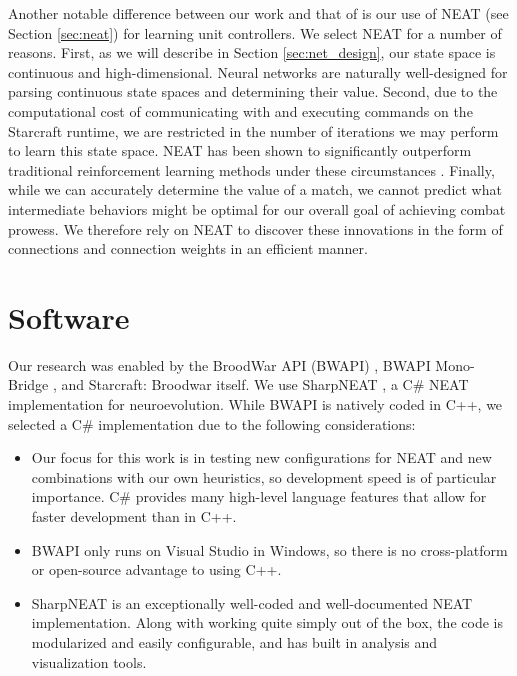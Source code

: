 \documentclass[10pt,a4paper,twocolumn]{article}
\begin{document}
Another notable difference between our work and that of \cite{rl_small_scale_combat} is our use of NEAT (see Section \ref{sec:neat}) for learning unit controllers. We select NEAT for a number of reasons. First, as we will describe in Section \ref{sec:net_design}, our state space is continuous and high-dimensional. Neural networks are naturally well-designed for parsing continuous state spaces and determining their value. Second, due to the computational cost of communicating with and executing commands on the Starcraft runtime, we are restricted in the number of iterations we may perform to learn this state space. NEAT has been shown to significantly outperform traditional reinforcement learning methods under these circumstances \cite{Stanley:2004:EEN:1048234}. Finally, while we can accurately determine the value of a match, we cannot predict what intermediate behaviors might be optimal for our overall goal of achieving combat prowess. We therefore rely on NEAT to discover these innovations in the form of connections and connection weights in an efficient manner.

\section{Software}
\label{sec:soft}

Our research was enabled by the BroodWar API (BWAPI) \cite{bwapi}, BWAPI Mono-Bridge \cite{monobridge}, and Starcraft: Broodwar itself. We use SharpNEAT \cite{sharpneat}, a C\# NEAT implementation for neuroevolution. While BWAPI is natively coded in C++, we selected a C\# implementation due to the following considerations:

\begin{itemize}
	\item Our focus for this work is in testing new configurations for NEAT and new combinations with our own heuristics, so development speed is of particular importance. C\# provides many high-level language features that allow for faster development than in C++.
	\item BWAPI only runs on Visual Studio in Windows, so there is no cross-platform or open-source advantage to using C++.
	\item SharpNEAT is an exceptionally well-coded and well-documented NEAT implementation. Along with working quite simply out of the box, the code is modularized and easily configurable, and has built in analysis and visualization tools.
\end{itemize}
\end{document}
